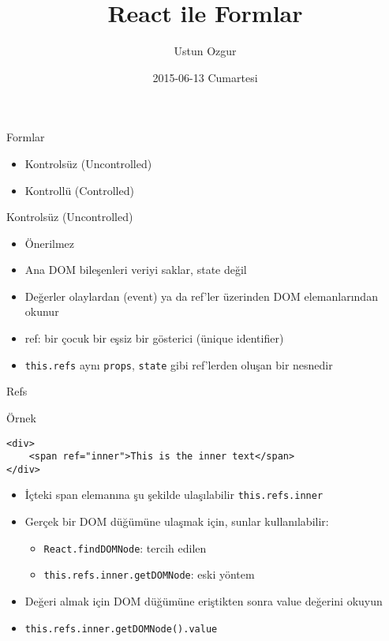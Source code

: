 \documentclass[presentation]{beamer}
\author{Ustun Ozgur}
\date{2015-06-13 Cumartesi}
\title{React ile Formlar}
\begin{document}
\maketitle

\begin{frame}[label=sec-1]{Formlar}
\begin{itemize}
\item Kontrolsüz (Uncontrolled)
\item Kontrollü (Controlled)
\end{itemize}
\end{frame}

\begin{frame}[fragile,label=sec-2]{Kontrolsüz (Uncontrolled)}
 \begin{itemize}
\item Önerilmez
\item Ana DOM bileşenleri veriyi saklar, state değil
\item Değerler olaylardan (event) ya da ref'ler üzerinden DOM elemanlarından okunur
\item ref: bir çocuk bir eşsiz bir gösterici (ünique identifier)
\item \texttt{this.refs} aynı \texttt{props}, \texttt{state} gibi ref'lerden oluşan bir nesnedir
\end{itemize}
\end{frame}

\begin{frame}[fragile,label=sec-3]{Refs}
 \begin{block}{Örnek}
\begin{verbatim}
<div>
    <span ref="inner">This is the inner text</span>
</div>
\end{verbatim}

\begin{itemize}
\item İçteki span elemanına şu şekilde ulaşılabilir \texttt{this.refs.inner}

\item Gerçek bir DOM düğümüne ulaşmak için, sunlar kullanılabilir:
\begin{itemize}
\item \texttt{React.findDOMNode}: tercih edilen
\item \texttt{this.refs.inner.getDOMNode}: eski yöntem
\end{itemize}

\item Değeri almak için DOM düğümüne eriştikten sonra value değerini okuyun
\item \texttt{this.refs.inner.getDOMNode().value}
\end{itemize}
\end{block}
\end{frame}
\end{document}
